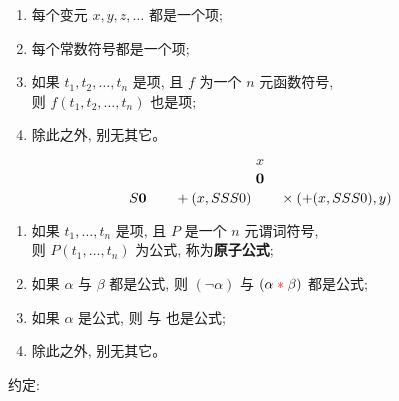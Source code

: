 \begin{frame}{}
  \begin{definition}[项 (Item)]
    \begin{enumerate}[(1)]
      \setlength{\itemsep}{8pt}
      \item 每个变元 $x, y, z, \dots$ 都是一个项;
      \item 每个常数符号都是一个项;
      \item 如果 $t_{1}, t_{2}, \dots, t_{n}$ 是项,
        且 $f$ 为一个 $n$ 元函数符号, \\
        则 $f(t_{1}, t_{2}, \dots, t_{n})$ 也是项;
      \item 除此之外, 别无其它。
    \end{enumerate}
  \end{definition}

  \[
    x
  \]
  \[
    {\bf 0}
  \]
  \[
    S{\bf 0} \qquad +(x, SSS0) \qquad \times(+(x, SSS0), y)
  \]
\end{frame}

\begin{frame}{}
  \begin{definition}[公式 (Formula)]
    \begin{enumerate}[(1)]
      \setlength{\itemsep}{8pt}
      \item 如果 $t_{1}, \dots, t_{n}$ 是项, 且 $P$ 是一个 $n$ 元谓词符号, \\
        则 $P(t_{1}, \dots, t_{n})$ 为公式, 称为{\bf 原子公式};
      \item 如果 $\alpha$ 与 $\beta$ 都是公式, 则 $(\lnot \alpha)$
        与 $(\alpha \;\textcolor{red}{\ast}\; \beta)$ 都是公式;
      \item 如果 $\alpha$ 是公式, 则 
        与  也是公式;
      \item 除此之外, 别无其它。
    \end{enumerate}
  \end{definition}

  \begin{center}
    约定:
  \end{center}
\end{frame}

